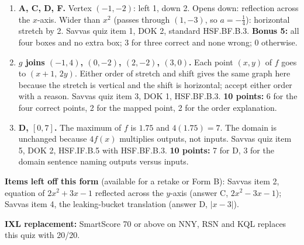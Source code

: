 \documentclass[11pt]{article}
\begin{document}
\begin{enumerate}
\item \textbf{A, C, D, F.} Vertex $(-1,-2)$: left 1, down 2. Opens down: reflection across the $x$-axis. Wider than $x^2$ (passes through $(1,-3)$, so $a=-\tfrac14$): horizontal stretch by 2. Savvas quiz item 1, DOK 2, standard HSF.BF.B.3. \textbf{Bonus 5:} all four boxes and no extra box; 3 for three correct and none wrong; 0 otherwise.
\item \textbf{$g$ joins $(-1,4)$, $(0,-2)$, $(2,-2)$, $(3,0)$.} Each point $(x,y)$ of $f$ goes to $(x+1,\,2y)$. Either order of stretch and shift gives the same graph here because the stretch is vertical and the shift is horizontal; accept either order with a reason. Savvas quiz item 3, DOK 1, HSF.BF.B.3. \textbf{10 points:} 6 for the four correct points, 2 for the mapped point, 2 for the order explanation.
\item \textbf{D, $[0,7]$.} The maximum of $f$ is $1.75$ and $4(1.75)=7$. The domain is unchanged because $4f(x)$ multiplies outputs, not inputs. Savvas quiz item 5, DOK 2, HSF.IF.B.5 with HSF.BF.B.3. \textbf{10 points:} 7 for D, 3 for the domain sentence naming outputs versus inputs.
\end{enumerate}

\textbf{Items left off this form} (available for a retake or Form B): Savvas item 2, equation of $2x^2+3x-1$ reflected across the $y$-axis (answer C, $2x^2-3x-1$); Savvas item 4, the leaking-bucket translation (answer D, $|x-3|$).

\textbf{IXL replacement:} SmartScore 70 or above on NNY, RSN and KQL replaces this quiz with 20/20.
\end{document}
